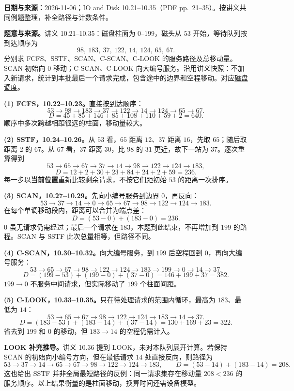 \begingroup
\renewcommand{\recordid}[1]{}
\renewcommand{\relatedtopic}[2]{\hyperref[topic:#1]{#2}}

\textbf{日期与来源：}2026-11-06；IO and Disk 10.21--10.35（PDF pp.~21--35）。按讲义共同例题整理，补全路径与计数条件。

\linespread{1.15}\selectfont
\setlength{\parskip}{0.4em}

\textbf{题意与来源。}讲义 10.21--10.35：磁盘柱面为 $0$--$199$，磁头从 $53$ 开始，等待队列按到达顺序为
\[
  98,\ 183,\ 37,\ 122,\ 14,\ 124,\ 65,\ 67.
\]
分别求 FCFS、SSTF、SCAN、C-SCAN、C-LOOK 的服务路径及总移动量。SCAN 初始向 $0$ 移动；C-SCAN、C-LOOK 向大编号服务。沿用讲义快照：不加入新请求，统计到本批最后一个请求完成，包含途中的边界和空程移动。对应\relatedtopic{SC2005-L23-T01}{磁盘调度}。

\begin{workedsolution}
\textbf{(1) FCFS，10.22--10.23。}直接按到达顺序：
\[
  53\to98\to183\to37\to122\to14\to124\to65\to67.
\]
\[
  D=45+85+146+85+108+110+59+2=\boxed{640}.
\]
顺序中多次跨越相距很远的柱面，移动量较大。

\textbf{(2) SSTF，10.24--10.26。}从 $53$ 看，$65$ 距离 $12$、$37$ 距离 $16$，先取 $65$；随后取距离 $2$ 的 $67$。从 $67$ 看，$37$ 距离 $30$，比 $98$ 的 $31$ 更近，故下一站为 $37$。逐次重算得到
\[
  53\to65\to67\to37\to14\to98\to122\to124\to183,
\]
\[
  D=12+2+30+23+84+24+2+59=\boxed{236}.
\]
每一步以\textbf{当前位置}重新比较剩余请求，不按它们距初始 $53$ 的距离一次排序。

\textbf{(3) SCAN，10.27--10.29。}先向小编号服务到边界 $0$，再反向：
\[
  53\to37\to14\to0\to65\to67\to98\to122\to124\to183.
\]
在每个单调移动段内，距离可以合并为端点差：
\[
  D=(53-0)+(183-0)=\boxed{236}.
\]
$0$ 虽无请求仍需经过；最后一个请求在 $183$，本题到此结束，不再增加到 $199$ 的路程。SCAN 与 SSTF 此次总量相等，但路径不同。

\textbf{(4) C-SCAN，10.30--10.32。}向大编号服务，到 $199$ 后空程回到 $0$，再向大编号服务：
\[
  53\to65\to67\to98\to122\to124\to183\to199\to0\to14\to37.
\]
\[
  D=(199-53)+(199-0)+(37-0)=146+199+37=\boxed{382}.
\]
$199\to0$ 不服务中间请求，但实际移动了 $199$ 个柱面间距。

\textbf{(5) C-LOOK，10.33--10.35。}只在待处理请求的范围内循环，最高为 $183$、最低为 $14$：
\[
  53\to65\to67\to98\to122\to124\to183\to14\to37.
\]
\[
  D=(183-53)+(183-14)+(37-14)=130+169+23=\boxed{322}.
\]
省去到 $199$ 和 $0$ 的移动，但 $183\to14$ 的空程仍需计入。

\textbf{LOOK 补充推导。}讲义 10.36 提到 LOOK，未对本队列展开计算。若保持 SCAN 的初始向小编号方向，但在最低请求 $14$ 处直接反向，则路径为
\[
  53\to37\to14\to65\to67\to98\to122\to124\to183,
\qquad D=(53-14)+(183-14)=208.
\]
这也给出 SSTF 并非全局最短路径的反例：同一请求集存在移动量 $208<236$ 的服务顺序。以上结果衡量的是柱面移动，换算时间还需设备模型。
\end{workedsolution}
\endgroup
